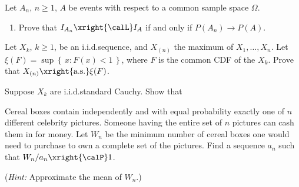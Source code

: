 \begin{problem}[DasGupta 7.5 (a)]
  Let \(A_n\), \(n\geq 1\), \(A\) be events with respect to a common sample
  space \(\Omega\).
  \begin{enumerate}[label=(\alph*),noitemsep]
  \item Prove that \(I_{A_n}\xright{\calL} I_A\) if and only if \(P(A_n)\to
    P(A)\).
  \end{enumerate}
\end{problem}
\begin{solution}

\end{solution}
\newpage

\begin{problem}
  Let \(X_k\), \(k\geq 1\), be an i.i.d.\@ sequence, and \(X_{(n)}\) the
  maximum of \(X_1,\dotsc,X_n\). Let
  \(\xi(F)=\sup\left\{\,x:F(x)<1\,\right\}\), where \(F\) is the common CDF
  of the \(X_k\). Prove that \(X_{(n)}\xright{\text{a.s.}}\xi(F)\).
\end{problem}
\begin{solution}

\end{solution}
\newpage

\begin{problem}[DasGupta 7.14 (a)]
  Suppose \(X_k\) are i.i.d.\@ standard Cauchy. Show that
\end{problem}
\begin{solution}

\end{solution}
\newpage

\begin{problem}
  Cereal boxes contain independently and with equal probability exactly one
  of \(n\) different celebrity pictures. Someone having the entire set of
  \(n\) pictures can cash them in for money. Let \(W_n\) be the minimum
  number of cereal boxes one would need to purchase to own a complete set
  of the pictures. Find a sequence \(a_n\) such that
  \(W_n/a_n\xright{\calP} 1\).

  \noindent (\emph{Hint:} Approximate the mean of \(W_n\).)
\end{problem}
\begin{solution}

\end{solution}
\newpage

